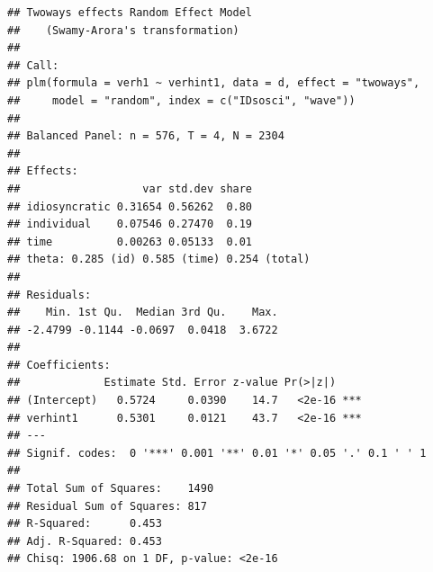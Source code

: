 \documentclass[
]{book}
\newenvironment{Shaded}{\begin{snugshade}}{\end{snugshade}}
\newcommand{\CommentTok}[1]{\textcolor[rgb]{0.56,0.35,0.01}{\textit{#1}}}
\newcommand{\DataTypeTok}[1]{\textcolor[rgb]{0.13,0.29,0.53}{#1}}
\newcommand{\KeywordTok}[1]{\textcolor[rgb]{0.13,0.29,0.53}{\textbf{#1}}}
\newcommand{\NormalTok}[1]{#1}
\newcommand{\OperatorTok}[1]{\textcolor[rgb]{0.81,0.36,0.00}{\textbf{#1}}}
\newcommand{\StringTok}[1]{\textcolor[rgb]{0.31,0.60,0.02}{#1}}
\begin{document}
\begin{Shaded}
\end{Shaded}

\begin{verbatim}
## Twoways effects Random Effect Model 
##    (Swamy-Arora's transformation)
## 
## Call:
## plm(formula = verh1 ~ verhint1, data = d, effect = "twoways", 
##     model = "random", index = c("IDsosci", "wave"))
## 
## Balanced Panel: n = 576, T = 4, N = 2304
## 
## Effects:
##                   var std.dev share
## idiosyncratic 0.31654 0.56262  0.80
## individual    0.07546 0.27470  0.19
## time          0.00263 0.05133  0.01
## theta: 0.285 (id) 0.585 (time) 0.254 (total)
## 
## Residuals:
##    Min. 1st Qu.  Median 3rd Qu.    Max. 
## -2.4799 -0.1144 -0.0697  0.0418  3.6722 
## 
## Coefficients:
##             Estimate Std. Error z-value Pr(>|z|)    
## (Intercept)   0.5724     0.0390    14.7   <2e-16 ***
## verhint1      0.5301     0.0121    43.7   <2e-16 ***
## ---
## Signif. codes:  0 '***' 0.001 '**' 0.01 '*' 0.05 '.' 0.1 ' ' 1
## 
## Total Sum of Squares:    1490
## Residual Sum of Squares: 817
## R-Squared:      0.453
## Adj. R-Squared: 0.453
## Chisq: 1906.68 on 1 DF, p-value: <2e-16
\end{verbatim}

\begin{Shaded}
\end{Shaded}
\end{document}
